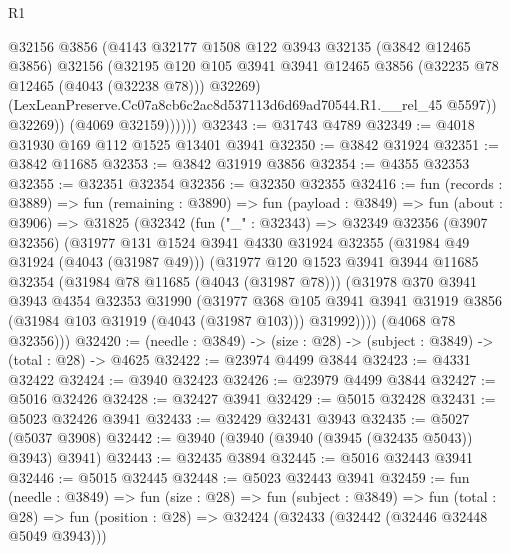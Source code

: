 \begin{lexlean}{R1}
\begin{coremodule}
                  @32156
                  @3856
                  (@4143
                    @32177
                    @1508
                    @122
                    @3943
                    @32135
                    (@3842 @12465 @3856)
                    @32156
                    (@32195
                      @120
                      @105
                      @3941
                      @3941
                      @12465
                      @3856
                      (@32235 @78 @12465 (@4043 (@32238 @78)))
                      @32269)
                    (LexLeanPreserve.Cc07a8cb6c2ac8d537113d6d69ad70544.R1.__rel_45 @5597))
                  @32269))
              (@4069 @32159))))))
@32343 := @31743 @4789
@32349 := @4018 @31930 @169 @112 @1525 @13401 @3941
@32350 := @3842 @31924
@32351 := @3842 @11685
@32353 := @3842 @31919 @3856
@32354 := @4355 @32353
@32355 := @32351 @32354
@32356 := @32350 @32355
@32416 := fun (records : @3889) =>
  fun (remaining : @3890) =>
  fun (payload : @3849) =>
  fun (about : @3906) =>
  @31825
    (@32342
      (fun ("_" : @32343) =>
      @32349
        @32356
        (@3907 @32356)
        (@31977
          @131
          @1524
          @3941
          @4330
          @31924
          @32355
          (@31984 @49 @31924 (@4043 (@31987 @49)))
          (@31977
            @120
            @1523
            @3941
            @3944
            @11685
            @32354
            (@31984 @78 @11685 (@4043 (@31987 @78)))
            (@31978
              @370
              @3941
              @3943
              @4354
              @32353
              @31990
              (@31977
                @368
                @105
                @3941
                @3941
                @31919
                @3856
                (@31984 @103 @31919 (@4043 (@31987 @103)))
                @31992))))
        (@4068 @78 @32356)))
@32420 := (needle : @3849) -> (size : @28) -> (subject : @3849) -> (total : @28) -> @4625
@32422 := @23974 @4499 @3844
@32423 := @4331 @32422
@32424 := @3940 @32423
@32426 := @23979 @4499 @3844
@32427 := @5016 @32426
@32428 := @32427 @3941
@32429 := @5015 @32428
@32431 := @5023 @32426 @3941
@32433 := @32429 @32431 @3943
@32435 := @5027 (@5037 @3908)
@32442 := @3940 (@3940 (@3940 (@3945 (@32435 @5043)) @3943) @3941)
@32443 := @32435 @3894
@32445 := @5016 @32443 @3941
@32446 := @5015 @32445
@32448 := @5023 @32443 @3941
@32459 := fun (needle : @3849) =>
  fun (size : @28) =>
  fun (subject : @3849) =>
  fun (total : @28) => fun (position : @28) => @32424 (@32433 (@32442 (@32446 @32448 @5049 @3943)))

\end{coremodule}
\end{lexlean}
